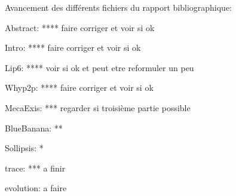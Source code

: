 Avancement des différents fichiers du rapport bibliographique:

Abstract: **** faire corriger et voir si ok 

Intro: **** faire corriger et voir si ok

Lip6: **** voir si ok et peut etre reformuler un peu
 
Whyp2p: **** faire corriger et voir si ok

MecaExis: *** regarder si troisième partie possible

BlueBanana: **

Sollipsis: *

trace: *** a finir

evolution: a faire

